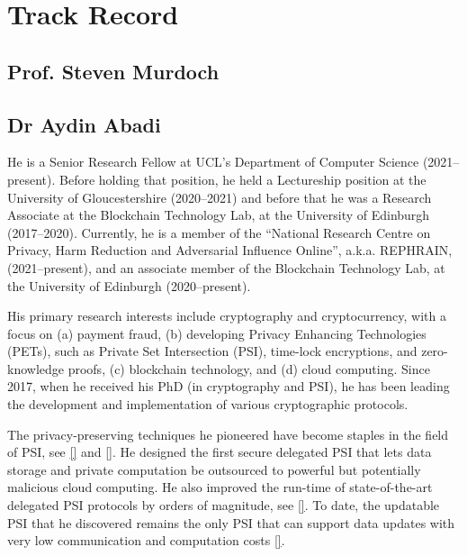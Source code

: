 
\section{Track Record}

\subsection{Prof. Steven Murdoch}



\subsection{Dr Aydin Abadi}


He is a Senior Research Fellow at UCL’s Department of Computer Science (2021--present). Before holding that position, he held a Lectureship position at the University of Gloucestershire (2020--2021) and before that he was a Research Associate at the Blockchain Technology Lab, at the University of Edinburgh (2017--2020). Currently, he is a member of the ``National Research Centre on Privacy, Harm Reduction and Adversarial Influence Online'', a.k.a. REPHRAIN, (2021--present), and an associate member of the Blockchain Technology Lab, at the University of Edinburgh (2020--present).

His primary research interests include cryptography and cryptocurrency, with a focus on (a) payment fraud, (b) developing Privacy Enhancing Technologies (PETs), such as Private Set Intersection (PSI), time-lock encryptions, and zero-knowledge proofs, (c) blockchain technology, and (d) cloud computing. Since 2017, when he received his PhD (in cryptography and PSI), he has been leading the development and implementation of various cryptographic protocols. 

The privacy-preserving techniques he pioneered have become staples in the field of PSI, see \href{https://link.springer.com/chapter/10.1007/978-3-319-18467-8_1}{[\printcntr]} and \href{https://link.springer.com/chapter/10.1007/978-3-662-54970-4_9}{[\printcntr]}. He designed the first secure delegated PSI that lets data storage and private computation be outsourced to powerful but potentially malicious cloud computing. He also improved the run-time of state-of-the-art delegated PSI protocols by orders of magnitude, see \href{https://ieeexplore.ieee.org/document/7934388}{[\printcntr]}. To date, the updatable PSI that he discovered remains the only PSI that can support data updates with very low communication and computation costs \href{https://link.springer.com/chapter/10.1007/978-3-031-18283-9_6}{[\printcntr]}.  


